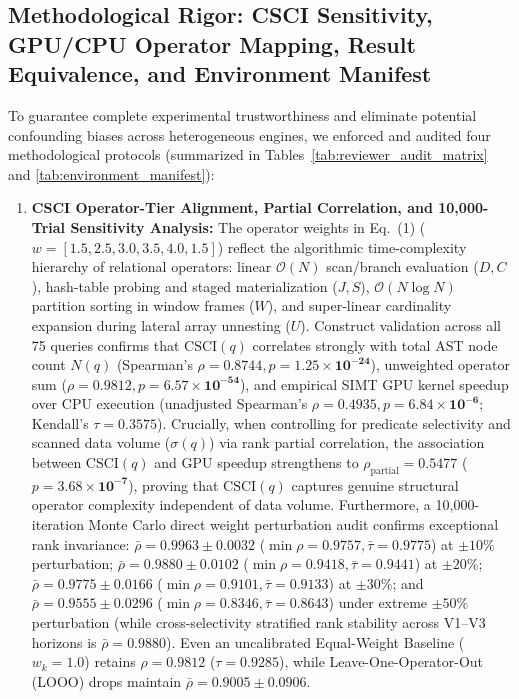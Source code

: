 \documentclass[10pt,a4paper]{article}
\begin{document}
\subsection{Methodological Rigor: CSCI Sensitivity, GPU/CPU Operator Mapping, Result Equivalence, and Environment Manifest}
To guarantee complete experimental trustworthiness and eliminate potential confounding biases across heterogeneous engines, we enforced and audited four methodological protocols (summarized in Tables~\ref{tab:reviewer_audit_matrix} and \ref{tab:environment_manifest}):
\begin{enumerate}[leftmargin=1.5em,itemsep=2pt]
    \item \textbf{CSCI Operator-Tier Alignment, Partial Correlation, and 10,000-Trial Sensitivity Analysis:} The operator weights in Eq.~(1) ($w = [1.5, 2.5, 3.0, 3.5, 4.0, 1.5]$) reflect the algorithmic time-complexity hierarchy of relational operators: linear $\mathcal{O}(N)$ scan/branch evaluation ($D, C$), hash-table probing and staged materialization ($J, S$), $\mathcal{O}(N \log N)$ partition sorting in window frames ($W$), and super-linear cardinality expansion during lateral array unnesting ($U$). Construct validation across all 75 queries confirms that $\text{CSCI}(q)$ correlates strongly with total AST node count $N(q)$ (Spearman's $\rho = \mathbf{0.8744}, p = \mathbf{1.25 \times 10^{-24}}$), unweighted operator sum ($\rho = \mathbf{0.9812}, p = \mathbf{6.57 \times 10^{-54}}$), and empirical SIMT GPU kernel speedup over CPU execution (unadjusted Spearman's $\rho = \mathbf{0.4935}, p = \mathbf{6.84 \times 10^{-6}}$; Kendall's $\tau = \mathbf{0.3575}$). Crucially, when controlling for predicate selectivity and scanned data volume ($\sigma(q)$) via rank partial correlation, the association between $\text{CSCI}(q)$ and GPU speedup strengthens to $\rho_{\text{partial}} = \mathbf{0.5477}$ ($p = \mathbf{3.68 \times 10^{-7}}$), proving that $\text{CSCI}(q)$ captures genuine structural operator complexity independent of data volume. Furthermore, a 10,000-iteration Monte Carlo direct weight perturbation audit confirms exceptional rank invariance: $\bar{\rho} = \mathbf{0.9963} \pm 0.0032$ ($\min \rho = 0.9757, \bar{\tau}=0.9775$) at $\pm 10\%$ perturbation; $\bar{\rho} = \mathbf{0.9880} \pm 0.0102$ ($\min \rho = 0.9418, \bar{\tau}=0.9441$) at $\pm 20\%$; $\bar{\rho} = \mathbf{0.9775} \pm 0.0166$ ($\min \rho = 0.9101, \bar{\tau}=0.9133$) at $\pm 30\%$; and $\bar{\rho} = \mathbf{0.9555} \pm 0.0296$ ($\min \rho = 0.8346, \bar{\tau}=0.8643$) under extreme $\pm 50\%$ perturbation (while cross-selectivity stratified rank stability across V1--V3 horizons is $\bar{\rho}=0.9880$). Even an uncalibrated Equal-Weight Baseline ($w_k = 1.0$) retains $\rho = \mathbf{0.9812}$ ($\tau = 0.9285$), while Leave-One-Operator-Out (LOOO) drops maintain $\bar{\rho} = \mathbf{0.9005} \pm 0.0906$.

\end{enumerate}
\end{document}
